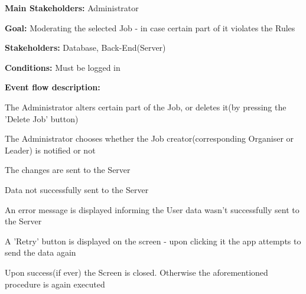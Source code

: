 				\noindent {}
				\begin{packed_item}
					\item \textbf{Main Stakeholders:} Administrator
					\item \textbf{Goal:} Moderating the selected Job - in case certain part of it violates the Rules
					\item \textbf{Stakeholders: } Database, Back-End(Server)
					\item \textbf{Conditions: } Must be logged in
					\item \textbf{Event flow description: }
					\begin{packed_enum}
						\item The Administrator alters certain part of the Job, or deletes it(by pressing the 'Delete Job' button)
						\item The Administrator chooses whether the Job creator(corresponding Organiser or Leader) is notified or not
						\item The changes are sent to the Server
					\end{packed_enum}
					
					\begin{packed_item}
						\item[3.a] Data not successfully sent to the Server
						\item[] \begin{packed_enum}
							\item An error message is displayed informing the User data wasn't successfully sent to the Server
							\item A 'Retry' button is displayed on the screen - upon clicking it the app attempts to send the data again
							\item Upon success(if ever) the Screen is closed. Otherwise the aforementioned procedure is again executed
						\end{packed_enum}
					\end{packed_item}
				\end{packed_item}
			
